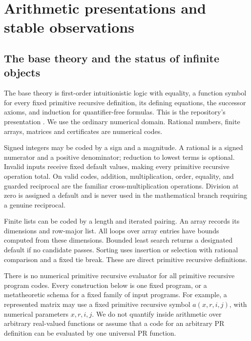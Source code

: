 \section{Arithmetic presentations and stable observations}
\label{sec:framework}

\subsection{The base theory and the status of infinite objects}

The base theory is first-order intuitionistic logic with equality, a function symbol for every fixed primitive recursive definition, its defining equations, the successor axioms, and induction for quantifier-free formulas. This is the repository's  presentation \cite{prsource}. We use the ordinary numerical domain. Rational numbers, finite arrays, matrices and certificates are numerical codes.

Signed integers may be coded by a sign and a magnitude. A rational is a signed numerator and a positive denominator; reduction to lowest terms is optional. Invalid inputs receive fixed default values, making every primitive recursive operation total. On valid codes, addition, multiplication, order, equality, and guarded reciprocal are the familiar cross-multiplication operations. Division at zero is assigned a default and is never used in the mathematical branch requiring a genuine reciprocal.

Finite lists can be coded by a length and iterated pairing. An array records its dimensions and row-major list. All loops over array entries have bounds computed from these dimensions. Bounded least search returns a designated default if no candidate passes. Sorting uses insertion or selection with rational comparison and a fixed tie break. These are direct primitive recursive definitions.

There is no numerical primitive recursive evaluator for all primitive recursive program codes. Every construction below is one fixed program, or a metatheoretic schema for a fixed family of input programs. For example, a represented matrix may use a fixed primitive recursive symbol $a(x,r,i,j)$, with numerical parameters $x,r,i,j$. We do not quantify inside arithmetic over arbitrary real-valued functions or assume that a code for an arbitrary PR definition can be evaluated by one universal PR function.

